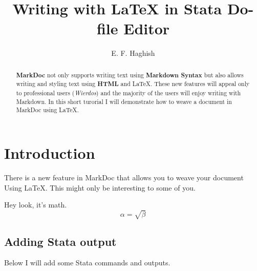 \documentclass{article}
\begin{document}
\title{Writing with \LaTeX{} in Stata Do-file Editor}
\author{E. F. Haghish}

\maketitle

\begin{abstract}
\textbf{MarkDoc} not only supports writing text using \textbf{Markdown Syntax} 
but also allows writing and styling text using \textbf{HTML} and \LaTeX{}. 
These new features will appeal only to professional users (\textit{Wierdos})
and the majority of the users will enjoy writing with Markdown. In this 
short turorial I will demonstrate how to weave a document in MarkDoc using 
\LaTeX{}. 
\end{abstract}

\section{Introduction}
There is a new feature in MarkDoc that allows you to weave your document
Using \LaTeX{}. This might only be interesting to some of you. 

Hey look, it's math.
\begin{equation}
\label{simple_equation}
\alpha = \sqrt{ \beta }
\end{equation}

\subsection{Adding Stata output}
Below I will add some Stata commands and outputs.
\end{document}
